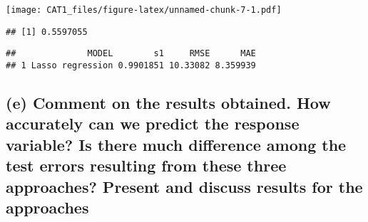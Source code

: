 \documentclass[
]{article}
\newenvironment{Shaded}{\begin{snugshade}}{\end{snugshade}}
\newcommand{\AttributeTok}[1]{\textcolor[rgb]{0.77,0.63,0.00}{#1}}
\newcommand{\CommentTok}[1]{\textcolor[rgb]{0.56,0.35,0.01}{\textit{#1}}}
\newcommand{\DecValTok}[1]{\textcolor[rgb]{0.00,0.00,0.81}{#1}}
\newcommand{\FunctionTok}[1]{\textcolor[rgb]{0.00,0.00,0.00}{#1}}
\newcommand{\NormalTok}[1]{#1}
\newcommand{\OtherTok}[1]{\textcolor[rgb]{0.56,0.35,0.01}{#1}}
\newcommand{\SpecialCharTok}[1]{\textcolor[rgb]{0.00,0.00,0.00}{#1}}
\newcommand{\StringTok}[1]{\textcolor[rgb]{0.31,0.60,0.02}{#1}}
\begin{document}
\texttt{[image: CAT1\_files/figure-latex/unnamed-chunk-7-1.pdf]}

\begin{Shaded}
\end{Shaded}

\begin{verbatim}
## [1] 0.5597055
\end{verbatim}

\begin{Shaded}
\end{Shaded}

\begin{verbatim}
##              MODEL        s1     RMSE      MAE
## 1 Lasso regression 0.9901851 10.33082 8.359939
\end{verbatim}

\hypertarget{e-comment-on-the-results-obtained.-how-accurately-can-we-predict-the-response-variable-is-there-much-difference-among-the-test-errors-resulting-from-these-three-approaches-present-and-discuss-results-for-the-approaches}{%
\subsection{(e) Comment on the results obtained. How accurately can we
predict the response variable? Is there much difference among the test
errors resulting from these three approaches? Present and discuss
results for the
approaches}\label{e-comment-on-the-results-obtained.-how-accurately-can-we-predict-the-response-variable-is-there-much-difference-among-the-test-errors-resulting-from-these-three-approaches-present-and-discuss-results-for-the-approaches}}
\end{document}
